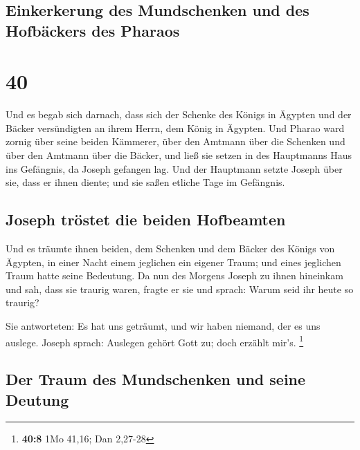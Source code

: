 \hypertarget{einkerkerung-des-mundschenken-und-des-hofbuxe4ckers-des-pharaos}{%
\subsection{Einkerkerung des Mundschenken und des Hofbäckers des
Pharaos}\label{einkerkerung-des-mundschenken-und-des-hofbuxe4ckers-des-pharaos}}

\hypertarget{section-39}{%
\section{40}\label{section-39}}

 Und es begab sich darnach, dass sich der Schenke des
Königs in Ägypten und der Bäcker versündigten an ihrem Herrn, dem König
in Ägypten.  Und Pharao ward zornig über seine beiden
Kämmerer, über den Amtmann über die Schenken und über den Amtmann über
die Bäcker,  und ließ sie setzen in des Hauptmanns Haus
ins Gefängnis, da Joseph gefangen lag.  Und der Hauptmann
setzte Joseph über sie, dass er ihnen diente; und sie saßen etliche Tage
im Gefängnis.

\hypertarget{joseph-truxf6stet-die-beiden-hofbeamten}{%
\subsection{Joseph tröstet die beiden
Hofbeamten}\label{joseph-truxf6stet-die-beiden-hofbeamten}}

 Und es träumte ihnen beiden, dem Schenken und dem Bäcker
des Königs von Ägypten, in einer Nacht einem jeglichen ein eigener
Traum; und eines jeglichen Traum hatte seine Bedeutung. 
Da nun des Morgens Joseph zu ihnen hineinkam und sah, dass sie traurig
waren,  fragte er sie und sprach: Warum seid ihr heute so
traurig?

 Sie antworteten: Es hat uns geträumt, und wir haben
niemand, der es uns auslege. Joseph sprach: Auslegen gehört Gott zu;
doch erzählt mir's. \footnote{\textbf{40:8} 1Mo 41,16; Dan 2,27-28}

\hypertarget{der-traum-des-mundschenken-und-seine-deutung}{%
\subsection{Der Traum des Mundschenken und seine
Deutung}\label{der-traum-des-mundschenken-und-seine-deutung}}

